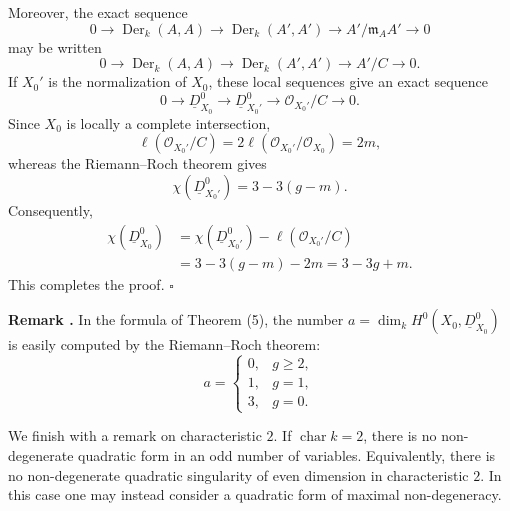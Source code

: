Moreover, the exact sequence
\[
0\longrightarrow\operatorname{Der}_k(A,A)
 \longrightarrow\operatorname{Der}_k(A',A')
 \longrightarrow A'/\mathfrak m_AA'\longrightarrow0
\]
may be written
\[
0\longrightarrow\operatorname{Der}_k(A,A)
 \longrightarrow\operatorname{Der}_k(A',A')
 \longrightarrow A'/C\longrightarrow0.
\]
If $X_0'$ is the normalization of $X_0$, these local sequences give
an exact sequence
\[
0\longrightarrow\underline D^0_{X_0}
 \longrightarrow\underline D^0_{X_0'}
 \longrightarrow\mathcal O_{X_0'}/C\longrightarrow0.
\]
Since $X_0$ is locally a complete intersection,
\[
\ell(\mathcal O_{X_0'}/C)
=2\ell(\mathcal O_{X_0'}/\mathcal O_{X_0})=2m,
\]
whereas the Riemann--Roch theorem gives
\[
\chi(\underline D^0_{X_0'})=3-3(g-m).
\]
Consequently,
\[
\begin{aligned}
\chi(\underline D^0_{X_0})
&=\chi(\underline D^0_{X_0'})
 -\ell(\mathcal O_{X_0'}/C)\\
&=3-3(g-m)-2m=3-3g+m.
\end{aligned}
\]
This completes the proof.
\hfill$\square$

\par\medskip
\noindent\textbf{Remark .}
In the formula of Theorem (5), the number
$a=\dim_kH^0(X_0,\underline D^0_{X_0})$ is easily computed by the
Riemann--Roch theorem:
\[
a=
\begin{cases}
0,&g\geq2,\\
1,&g=1,\\
3,&g=0.
\end{cases}
\]

We finish with a remark on characteristic $2$. If
$\operatorname{char}k=2$, there is no non-degenerate quadratic form
in an odd number of variables. Equivalently, there is no
non-degenerate quadratic singularity of even dimension in
characteristic $2$. In this case one may instead consider a quadratic
form of maximal non-degeneracy.
